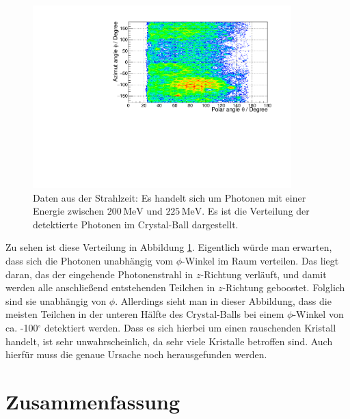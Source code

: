 \documentclass[a4paper,11pt,oneside,final,german,openbib,pdftex]{scrbook}
\begin{document}
{\begin{figure}[h!]
	\begin{center}
		\includegraphics[width=100mm]{NewCalib/ThetaPhiVerteilung/20172404ThetaPhi200MeVBeam}
		\caption[Strahlzeit: Verteilung der detektierten Photonen im CB]{Daten aus der Strahlzeit: Es handelt sich um Photonen mit einer Energie zwischen $200\,\text{MeV}$ und $225\,\text{MeV}$. Es ist die Verteilung der detektierte Photonen im Crystal-Ball dargestellt.}
		\label{fig:Verteilung-der-Photonen-im-CB}
	\end{center}
\end{figure}
Zu sehen ist diese Verteilung in Abbildung \ref{fig:Verteilung-der-Photonen-im-CB}. Eigentlich w\"urde man erwarten, dass sich die Photonen unabh\"angig vom $\phi$-Winkel im Raum verteilen. Das liegt daran, das der eingehende Photonenstrahl in $z$-Richtung verl\"auft, und damit werden alle anschlie{\ss}end entstehenden Teilchen in $z$-Richtung geboostet. Folglich sind sie unabh\"angig von $\phi$. 
Allerdings sieht man in dieser Abbildung, dass die meisten Teilchen in der unteren H\"alfte des Crystal-Balls bei einem $\phi$-Winkel von ca. -100$^{\circ}$ detektiert werden.
Dass es sich hierbei um einen rauschenden Kristall handelt, ist sehr unwahrscheinlich, da sehr viele Kristalle betroffen sind.
Auch hierfür muss die genaue Ursache noch herausgefunden werden.






\chapter{Zusammenfassung}
\label{chap:Zusammenfassung}

}
\end{document}
